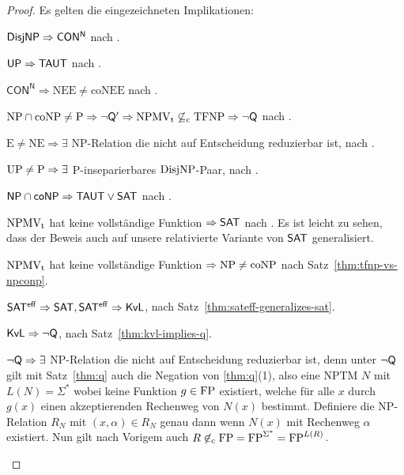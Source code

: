 \begin{proof}
    Es gelten die eingezeichneten Implikationen:
    \begin{Prooflist}[nosep]
\item $\mathsf{DisjNP} \Rightarrow \mathsf{CON^N}$ nach \textcite{kobler_optimal_2003}.
\item $\mathsf{UP} \Rightarrow \mathsf{TAUT}$ nach \textcite[Cor.~4.1]{kobler_optimal_2003}. %
\item $\mathsf{CON^N}\Rightarrow \mathrm{NEE\neq coNEE}$ nach \textcite{kobler_optimal_2003}.
\item $\mathrm{NP}\cap\mathrm{coNP}\neq \mathrm{P} \Rightarrow \neg\mathsf{Q}' \Rightarrow \mathrm{NPMV_t} \not\subseteq_\mathrm{c} \mathrm{TFNP} \Rightarrow \neg\mathsf{Q}$ nach \textcite{fenner_inverting_2003}.
\item $\mathrm{E\neq NE}\Rightarrow \exists$ NP-Relation die nicht auf Entscheidung reduzierbar ist, nach \textcite{impagliazzo_1991}.
\item $\mathrm{UP}\neq\mathrm{P} \Rightarrow \exists$ P-inseparierbares $\mathrm{DisjNP}$-Paar, nach \textcite[Thm.~5]{grollmann_complexity_1988}.
\item $\mathsf{NP}{}\cap{}\mathsf{coNP}\Rightarrow \mathsf{TAUT}\lor\mathsf{SAT}$ nach \textcite[Cor.~5.1]{kobler_optimal_2003}. %
\item $\mathrm{NPMV_t}$ hat keine vollständige Funktion $\Rightarrow \mathsf{SAT}$ nach \textcite[Thm.~25]{beyersdorff_nondeterministic_2009}. Es ist leicht zu sehen, dass der Beweis auch auf unsere relativierte Variante von $\mathsf{SAT}$ generalisiert.
\item $\mathrm{NPMV_t}$ hat keine vollständige Funktion $\Rightarrow \mathrm{NP}\neq\mathrm{coNP}$ nach Satz~\ref{thm:tfnp-vs-npconp}.
\item $\mathsf{SAT^{eff}} \Rightarrow \mathsf{SAT}, \mathsf{SAT^{eff}}\Rightarrow \mathsf{KvL}$, nach Satz~\ref{thm:sateff-generalizes-sat}.
\item $\mathsf{KvL}\Rightarrow\neg\mathsf{Q}$, nach Satz~\ref{thm:kvl-implies-q}.
\item $\neg\mathsf{Q}\Rightarrow \exists$ NP-Relation die nicht auf Entscheidung reduzierbar ist, denn unter $\neg\mathsf{Q}$ gilt mit Satz~\ref{thm:q} auch die Negation von \ref{thm:q}(1), also eine NPTM $N$ mit $L(N)=\Sigma^*$ wobei keine Funktion $g\in\mathrm{FP}$ existiert, welche für alle $x$ durch $g(x)$ einen akzeptierenden Rechenweg von $N(x)$ bestimmt.
    Definiere die NP-Relation $R_N$ mit $(x,\alpha)\in R_N$ genau dann wenn $N(x)$ mit Rechenweg $\alpha$ existiert. Nun gilt nach Vorigem auch $R\not\in_\mathrm{c} \mathrm{FP}=\mathrm{FP}^{\Sigma^*} = \mathrm{FP}^{L(R)}$.

\end{Prooflist}
\end{proof}

